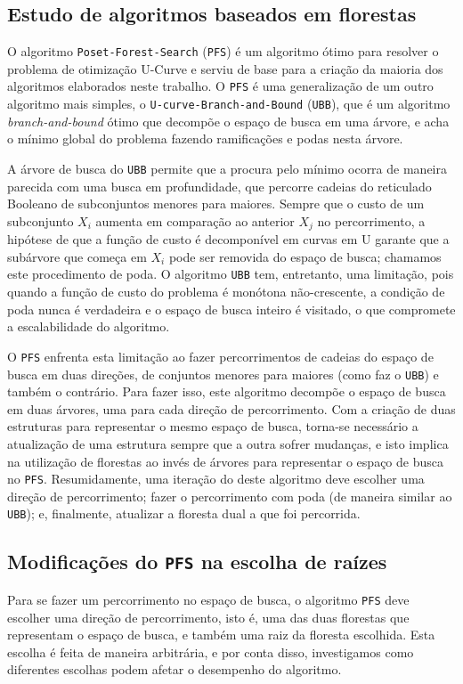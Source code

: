\documentclass[12pt]{article}
\newcommand{\foreignword}[1]{\textit{#1}}
\newcommand{\algname}[1]{\texttt{#1}}
\begin{document}
\subsection{Estudo de algoritmos baseados em florestas}
\label{sec:pfs_studies}
O algoritmo \algname{Poset\--Forest\--Search} (\algname{PFS}) é um 
algoritmo ótimo para resolver o problema de otimização U-Curve e serviu 
de base para a criação da maioria dos algoritmos elaborados neste 
trabalho. O \algname{PFS} é uma generalização de um outro algoritmo mais
simples, o \algname{U-curve-Branch-and-Bound} (\algname{UBB}), que é
um algoritmo \foreignword{branch-and-bound} ótimo que decompõe o espaço
de busca em uma árvore, e acha o mínimo global do problema fazendo 
ramificações e podas nesta árvore.

A árvore de busca do \algname{UBB} permite que a procura pelo mínimo 
ocorra de maneira parecida com uma busca em profundidade, que percorre
cadeias do reticulado Booleano de subconjuntos menores para maiores. 
Sempre que o custo de um subconjunto $X_i$ aumenta em comparação ao 
anterior $X_j$ no percorrimento, a hipótese de que a função de custo é 
decomponível em curvas em U garante que a subárvore que começa em $X_i$
pode ser removida do espaço de busca; chamamos este procedimento de
poda. O algoritmo \algname{UBB} tem, entretanto, uma limitação, pois
quando a função de custo do problema é monótona não-crescente, a 
condição de poda nunca é verdadeira e o espaço de busca inteiro é 
visitado, o que compromete a escalabilidade do algoritmo.

O \algname{PFS} enfrenta esta limitação ao fazer percorrimentos de
cadeias do espaço de busca em duas direções, de conjuntos menores para
maiores (como faz o \algname{UBB}) e também o contrário. Para fazer 
isso, este algoritmo decompõe o espaço de busca em duas árvores, uma 
para cada direção de percorrimento. Com a criação de duas estruturas 
para representar o mesmo espaço de busca, torna-se necessário a 
atualização de uma estrutura sempre que a outra sofrer mudanças, e isto
implica na utilização de florestas ao invés de árvores para representar
o espaço de busca no \algname{PFS}. Resumidamente, uma iteração do 
deste algoritmo deve escolher uma direção de percorrimento; fazer o 
percorrimento com poda (de maneira similar ao \algname{UBB}); e, 
finalmente, atualizar a floresta dual a que foi percorrida.


\subsection{Modificações do \algname{PFS} na escolha de raízes}
\label{sec:pfs_root_choice}
Para se fazer um percorrimento no espaço de busca, o algoritmo 
\algname{PFS} deve escolher uma direção de percorrimento, isto é, uma
das duas florestas que representam o espaço de busca, e também uma raiz
da floresta escolhida. Esta escolha é feita de maneira arbitrária, e por
conta disso, investigamos como diferentes escolhas podem afetar o 
desempenho do algoritmo.
\end{document}
